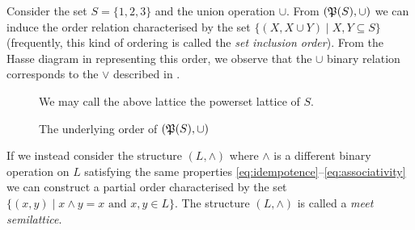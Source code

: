 \begin{example}
\label{example:power-set-lattice}
     Consider the set $S = \{1,2,3\}$ and the union operation $\cup$. From $(\mathfrak{P}({S}), \cup)$ we can induce the order relation characterised by the set $\{(X, X \cup Y) \mid X,Y \subseteq S \}$ (frequently, this kind of ordering is called the \textit{set inclusion order}). From the Hasse diagram in  representing this order, we observe that the $\cup$ binary relation corresponds to the $\vee$ described in .
%
\begin{figure}[H]
  \centering
  \caption{The underlying order of $(\mathfrak{P}({S}), \cup)$}
  \label{figure:set-inclusion-order}

  We may call the above lattice the powerset lattice of $S$.
\end{figure}
\end{example}

If we instead consider the structure $(L, \wedge)$ where $\wedge$ is a different binary operation on $L$ satisfying the same properties \cref{eq:idempotence}--\cref{eq:associativity} we can construct a partial order characterised by the set $\{(x,y) \mid x \wedge y = x \text{ and } x,y \in L\}$. The structure $(L, \wedge)$ is called a \textit{meet semilattice}.

